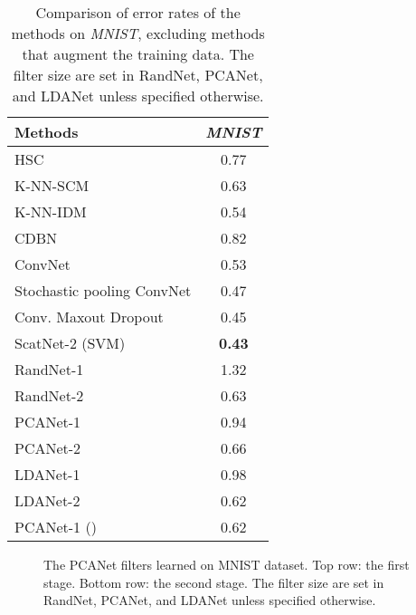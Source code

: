 \documentclass[10pt,journal,compsoc]{IEEEtran}
\begin{document}
\begin{table}[htbp]\centering
\caption{Comparison of error rates  of the methods on {\em MNIST}, excluding methods that augment the training data. The filter size  are set in RandNet, PCANet, and LDANet unless specified otherwise.}
\begin{tabular}{l|c}
  \hline
Methods           & {\it MNIST} \\  \hline \hline
  HSC \cite{Yu2011}  &    0.77  \\
  K-NN-SCM \cite{Belongie2002} &  0.63 \\
  K-NN-IDM \cite{Keysers2007} & 0.54 \\
  CDBN \cite{Lee2009}           & 0.82  \\
  ConvNet \cite{Jarrett2009}          & 0.53  \\
  Stochastic pooling ConvNet \cite{Zeiler2013} & 0.47   \\
  Conv. Maxout  Dropout \cite{Goodfellow2013} & 0.45   \\
  ScatNet-2 (SVM) \cite{Bruna2013}      & {\bf 0.43}  \\ \hline
  RandNet-1 &  1.32 \\
  RandNet-2 &  0.63 \\
  PCANet-1    & 0.94  \\
  PCANet-2    & 0.66  \\
  LDANet-1   & 0.98 \\
  LDANet-2  &  0.62 \\ \hline
  PCANet-1 () & 0.62 \\
\hline
\end{tabular}\label{table: mnist_standard}
\end{table}



\begin{figure}[t]
\centering
{}
\caption{The PCANet filters learned on MNIST dataset. Top row: the first stage. Bottom row: the second stage. The filter size  are set in RandNet, PCANet, and LDANet unless specified otherwise.}\label{fig: MNIST_filter}
\end{figure}
\end{document}
